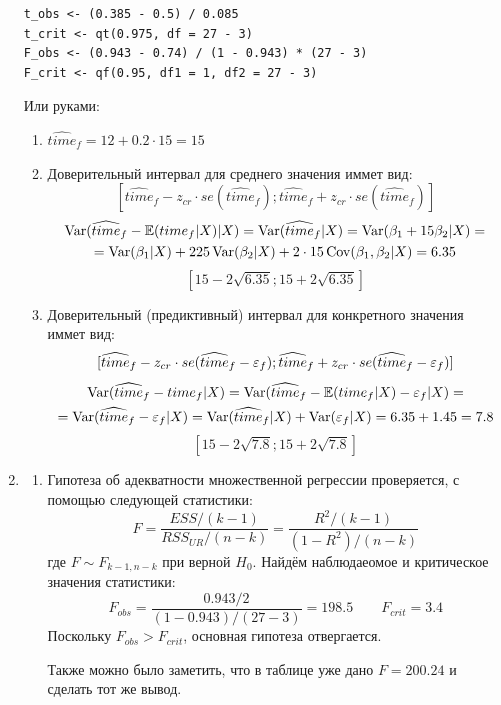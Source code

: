 \documentclass[12pt, a4paper]{article}
\begin{document}
\begin{enumerate}
\begin{verbatim}
t_obs <- (0.385 - 0.5) / 0.085
t_crit <- qt(0.975, df = 27 - 3)
F_obs <- (0.943 - 0.74) / (1 - 0.943) * (27 - 3)
F_crit <- qf(0.95, df1 = 1, df2 = 27 - 3)
\end{verbatim}

Или руками:
\begin{enumerate}
\item $\widehat{time}_f = 12 + 0.2 \cdot 15 = 15$
\item Доверительный интервал для среднего значения иммет вид:
\[
[\widehat{time}_f - z_{cr} \cdot se(\widehat{time}_f); \widehat{time}_f + z_{cr} \cdot se(\widehat{time}_f)]
\]
\begin{multline*}
\operatorname{Var}(\widehat{time}_f - \mathbb{E}(time_f | X)|X) = \operatorname{Var}(\widehat{time}_f|X) = \operatorname{Var}(\beta_1 + 15\beta_2 | X) = \\
= \operatorname{Var}(\beta_1|X) + 225 \operatorname{Var}(\beta_2|X) + 2 \cdot 15 \operatorname{Cov}(\beta_1, \beta_2|X) = 6.35 \\
\end{multline*}
\[
[15 - 2 \sqrt{6.35}; 15 + 2 \sqrt{6.35}]
\]
\item Доверительный (предиктивный) интервал для конкретного значения иммет вид:
\[
[\widehat{time}_f - z_{cr} \cdot se(\widehat{time}_f - \varepsilon_f); \widehat{time}_f+ z_{cr} \cdot se(\widehat{time}_f - \varepsilon_f)]
\]
\begin{multline*}
\operatorname{Var}(\widehat{time}_f - time_f | X) = \operatorname{Var}(\widehat{time}_f - \mathbb{E}(time_f | X) - \varepsilon_f |X) = \\
= \operatorname{Var}(\widehat{time}_f - \varepsilon_f |X) = \operatorname{Var}(\widehat{time}_f|X) + \operatorname{Var}(\varepsilon_f |X) = 6.35 + 1.45 = 7.8
\end{multline*}
\[
[15 - 2 \sqrt{7.8}; 15 + 2 \sqrt{7.8}]
\]
\end{enumerate}
\item
\begin{enumerate}
\item Гипотеза об адекватности множественной регрессии проверяется, с помощью следующей статистики:
\[
F = \frac{ESS/(k-1)}{RSS_{UR} / (n-k)} = \frac{R^2/(k-1)}{(1-R^2)/(n-k)}
\]
где $F \sim F_{k-1, n-k}$ при верной $H_0$. Найдём наблюдаеомое и критическое значения статистики:
\[
F_{obs} = \frac{0.943/2}{(1-0.943)/(27-3)} = 198.5 \quad \quad F_{crit} = 3.4
\]
Поскольку $F_{obs} > F_{crit}$, основная гипотеза отвергается.

Также можно было заметить, что в таблице уже дано $F = 200.24$ и сделать тот же вывод.


\end{enumerate}
\end{enumerate}
\end{document}

